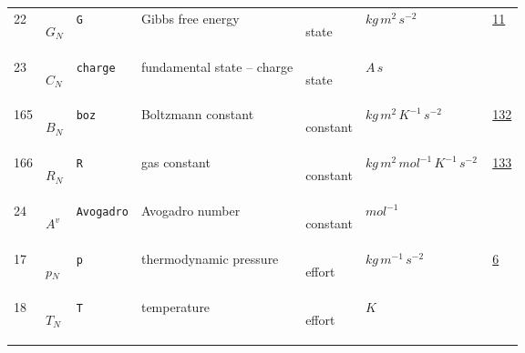 \begin{longtable}{|p{1cm}|p{2.5cm}|p{4.5cm}|p{8cm}|p{3.0cm}|p{3cm}|p{1cm}|}
            22
             & \hypertarget{"v:22"}{ $ {G}{_{N}} $}
             & \verb|G|
             & Gibbs free energy
             & \begin{lay}state \end{lay}
             & $ kg \,m^{2} \,s^{-2} \, $
             &                 \hyperlink{"e:11"}{ 11 }
                 \\
            23
             & \hypertarget{"v:23"}{ $ {C}{_{N}} $}
             & \verb|charge|
             & fundamental state -- charge
             & \begin{lay}state \end{lay}
             & $ A \,s \, $
             & \\
            165
             & \hypertarget{"v:165"}{ $ {B}{_{N}} $}
             & \verb|boz|
             & Boltzmann constant
             & \begin{lay}constant \end{lay}
             & $ kg \,m^{2} \,K^{-1} \,s^{-2} \, $
             &                 \hyperlink{"e:132"}{ 132 }
                 \\
            166
             & \hypertarget{"v:166"}{ $ {R}{_{N}} $}
             & \verb|R|
             & gas constant
             & \begin{lay}constant \end{lay}
             & $ kg \,m^{2} \,mol^{-1} \,K^{-1} \,s^{-2} \, $
             &                 \hyperlink{"e:133"}{ 133 }
                 \\
            24
             & \hypertarget{"v:24"}{ $ {{A^v}}{_{}} $}
             & \verb|Avogadro|
             & Avogadro number
             & \begin{lay}constant \end{lay}
             & $ mol^{-1} \, $
             & \\
            17
             & \hypertarget{"v:17"}{ $ {p}{_{N}} $}
             & \verb|p|
             & thermodynamic pressure
             & \begin{lay}effort \end{lay}
             & $ kg \,m^{-1} \,s^{-2} \, $
             &                 \hyperlink{"e:6"}{ 6 }
                 \\
            18
             & \hypertarget{"v:18"}{ $ {T}{_{N}} $}
             & \verb|T|
             & temperature
             & \begin{lay}effort \end{lay}
             & $ K \, $

\end{longtable}
